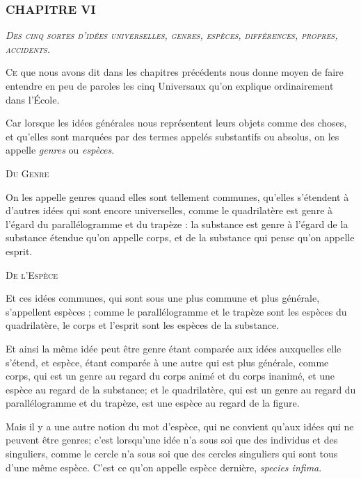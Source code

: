 \subsubsection{\centering \Large CHAPITRE VI}
\begin{center}\emph{\large\scshape Des cinq sortes d'idées universelles, genres, espèces, différences, propres, accidents.}\end{center}

	\lettrine{C}{e} que nous avons dit dans les chapitres précédents nous donne moyen de faire entendre en peu de paroles les cinq Universaux qu'on explique ordinairement dans l'École.

Car lorsque les idées générales nous représentent leurs objets comme des choses, et qu'elles sont marquées par des termes appelés substantifs ou absolus, on les appelle \emph{genres} ou \emph{espèces}.

\begin{center}{\large\scshape Du Genre}\end{center}

On les appelle genres quand elles sont tellement communes, qu'elles s'étendent à d'autres idées qui sont encore universelles, comme le quadrilatère est genre à l'égard du parallélogramme et du trapèze : la substance est genre à l'égard de la substance étendue qu'on appelle corps, et de la substance qui pense qu'on appelle esprit.

\begin{center}{\large\scshape De l'Espèce}\end{center}

Et ces idées communes, qui sont sous une plus commune et plus générale, s'appellent espèces ; comme le parallélogramme et le trapèze sont les espèces du quadrilatère, le corps et l'esprit sont les espèces de la substance.

Et ainsi la même idée peut être genre étant comparée aux idées auxquelles elle s'étend, et espèce, étant comparée à une autre qui est plus générale, comme corps, qui est un genre au regard du corps animé et du corps inanimé, et une espèce au regard de la substance; et le quadrilatère, qui est un genre au regard du parallélogramme et du trapèze, est une espèce au regard de la figure.

Mais il y a une autre notion du mot d'espèce, qui ne convient qu'aux idées qui ne peuvent être genres; c'est lorsqu'une idée n'a sous soi que des individus et des singuliers, comme le cercle n'a sous soi que des cercles singuliers qui sont tous d'une même espèce. C'est ce qu'on appelle espèce dernière, \emph{species infima}.

